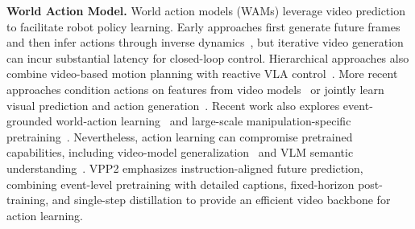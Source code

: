 \textbf{World Action Model.}
World action models (WAMs) leverage video prediction to facilitate robot policy learning. Early approaches first generate future frames and then infer actions through inverse dynamics~\citep{du2024learning,black2023zero,bharadhwaj2024gen2act,liang2024dreamitate,feng2025vidar}, but iterative video generation can incur substantial latency for closed-loop control. Hierarchical approaches also combine video-based motion planning with reactive VLA control~\citep{zhang2026veoact}. More recent approaches condition actions on features from video models~\citep{hu2024video,liao2025genie,jia2025video2act,yan2026svam} or jointly learn visual prediction and action generation~\citep{zhang2025up,guo2024prediction,li2025unified,zhu2025unified,ma2026dit4dit,kim2026cosmospolicy,yan2026robustwam,ye2026dreamzero,li2026lingbotva,bi2026motus,motubrainteam2026motubrain}. Recent work also explores event-grounded world-action learning~\citep{li2026wallwm} and large-scale manipulation-specific pretraining~\citep{agibot2026geact2}. Nevertheless, action learning can compromise pretrained capabilities, including video-model generalization~\citep{mishra2026understanding} and VLM semantic understanding~\citep{zhang2026uam}. VPP2 emphasizes instruction-aligned future prediction, combining event-level pretraining with detailed captions, fixed-horizon post-training, and single-step distillation to provide an efficient video backbone for action learning.



